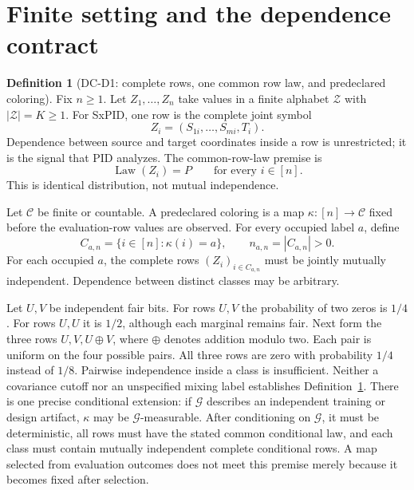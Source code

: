 \documentclass[11pt]{article}
\theoremstyle{definition}
\newtheorem{definition}[theorem]{Definition}
\newcommand{\cZ}{\mathcal{Z}}
\newcommand{\cC}{\mathcal{C}}
\begin{document}
\section{Finite setting and the dependence contract}

\begin{definition}[DC-D1: complete rows, one common row law, and predeclared coloring]
\label{def:dc-color}
Fix $n\ge1$.  Let $Z_1,\ldots,Z_n$ take values in a finite alphabet $\cZ$ with
$|\cZ|=K\ge1$.  For SxPID, one row is the complete joint symbol
\begin{equation}
  Z_i=(S_{1i},\ldots,S_{mi},T_i).
\end{equation}
Dependence between source and target coordinates inside a row is unrestricted; it is the signal
that PID analyzes.  The common-row-law premise is
\begin{equation}\label{eq:common-row-law}
  \operatorname{Law}(Z_i)=P
  \qquad\text{for every }i\in[n].
\end{equation}
This is identical distribution, not mutual independence.

Let $\cC$ be finite or countable.  A predeclared coloring is a map
$\kappa:[n]\to\cC$ fixed before the evaluation-row values are observed.  For every occupied label
$a$, define
\begin{equation}
  C_{a,n}=\{i\in[n]:\kappa(i)=a\},
  \qquad
  n_{a,n}=|C_{a,n}|>0.
\end{equation}
For each occupied $a$, the complete rows $(Z_i)_{i\in C_{a,n}}$ must be jointly mutually
independent.  Dependence between distinct classes may be arbitrary.
\end{definition}

Let $U,V$ be independent fair bits. For rows $U,V$ the probability of two zeros is $1/4$. For
rows $U,U$ it is $1/2$, although each marginal remains fair. Next form the three rows
$U,V,U\oplus V$, where $\oplus$ denotes addition modulo two. Each pair is uniform on the four
possible pairs. All three rows are zero with probability $1/4$ instead of $1/8$.
Pairwise independence inside a class is insufficient.  Neither a covariance cutoff nor an
unspecified mixing label establishes Definition~\ref{def:dc-color}.  There is one precise
conditional extension: if $\mathcal G$ describes an independent training or design artifact,
$\kappa$ may be $\mathcal G$-measurable.  After conditioning on $\mathcal G$, it must be
deterministic, all rows must have the stated common conditional law, and each class must contain
mutually independent complete conditional rows.  A map selected from evaluation outcomes does not
meet this premise merely because it becomes fixed after selection.
\end{document}
